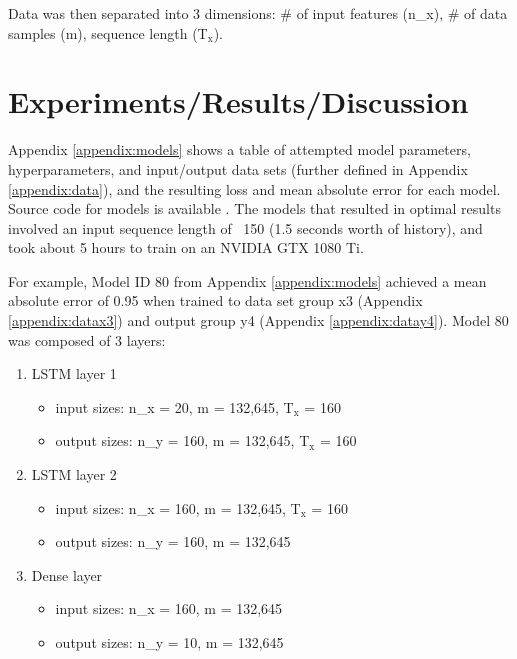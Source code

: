 \documentclass{article}
\begin{document}
Data was then separated into 3 dimensions: \# of input features (n\_x), \# of data samples (m), sequence length (T$_{\text{x}}$).

\section{Experiments/Results/Discussion}

Appendix \ref{appendix:models} shows a table of attempted model parameters, hyperparameters, and input/output data sets (further defined in Appendix \ref{appendix:data}), and the resulting loss and mean absolute error for each model. Source code for models is available \cite{casterton_2019}. The models that resulted in optimal results involved an input sequence length of ~150 (1.5 seconds worth of history), and took about 5 hours to train on an NVIDIA GTX 1080 Ti.

For example, Model ID 80 from Appendix \ref{appendix:models} achieved a mean absolute error of 0.95 when trained to data set group x3 (Appendix \ref{appendix:datax3}) and output group y4 (Appendix  \ref{appendix:datay4}). Model 80 was composed of 3 layers:
 
 \begin{enumerate}
    \item LSTM layer 1
    \begin{itemize}
        \item input sizes: n\_x = 20, m = 132,645, T$_{\text{x}}$ = 160
        \item output sizes: n\_y = 160, m = 132,645, T$_{\text{x}}$ = 160
    \end{itemize}
    \item LSTM layer 2
    \begin{itemize}
        \item input sizes: n\_x = 160, m = 132,645, T$_{\text{x}}$ = 160
        \item output sizes: n\_y = 160, m = 132,645
    \end{itemize}
    \item Dense layer
    \begin{itemize}
        \item input sizes: n\_x = 160, m = 132,645
        \item output sizes: n\_y = 10, m = 132,645
    \end{itemize}
\end{enumerate}
 
\end{document}
